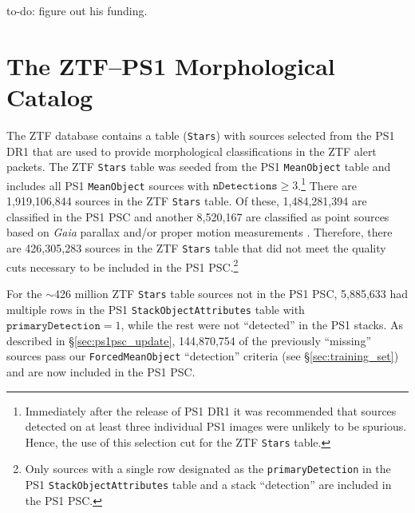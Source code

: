 \documentclass[twocolumn]{aastex63}
\newcommand{\todo}[1]{{\color{magenta} to-do: {#1}}}
\begin{document}
\todo{figure out his funding}.




\appendix

\section{The ZTF--PS1 Morphological Catalog}\label{app:cat_counts}

The ZTF database contains a table (\texttt{Stars}) with sources selected from
the PS1 DR1 that are used to provide morphological classifications in the ZTF
alert packets. The ZTF \texttt{Stars} table was seeded from the PS1
\texttt{MeanObject} table and includes all PS1 \texttt{MeanObject} sources
with $\mathtt{nDetections} \ge 3$.\footnote{Immediately after the release of
PS1 DR1 it was recommended that sources detected on at least three individual
PS1 images were unlikely to be spurious. Hence, the use of this selection cut
for the ZTF \texttt{Stars} table.} There are 1,919,106,844 sources in the ZTF
\texttt{Stars} table. Of these, 1,484,281,394 are classified in the PS1 PSC
and another 8,520,167 are classified as point sources based on \textit{Gaia}
parallax and/or proper motion measurements \citep{Tachibana18}. Therefore,
there are 426,305,283 sources in the ZTF \texttt{Stars} table that did not
meet the quality cuts necessary to be included in the PS1 PSC.\footnote{Only
sources with a single row designated as the \texttt{primaryDetection} in the
PS1 \texttt{StackObjectAttributes} table and a stack ``detection''
\citep[i.e., the PSF, Kron, and aperture flux are all $>0$ in at least one
filter, see][]{Tachibana18} are included in the PS1 PSC. }

For the $\sim$426 million ZTF \texttt{Stars} table sources not in the PS1 PSC,
5,885,633 had multiple rows in the PS1 \texttt{StackObjectAttributes} table
with $\mathtt{primaryDetection} = 1$, while the rest were not ``detected'' in
the PS1 stacks. As described in \S\ref{sec:ps1psc_update}, 144,870,754 of the
previously ``missing'' sources pass our \texttt{ForcedMeanObject}
``detection'' criteria (see \S\ref{sec:training_set}) and are now included in
the PS1 PSC.
\end{document}
